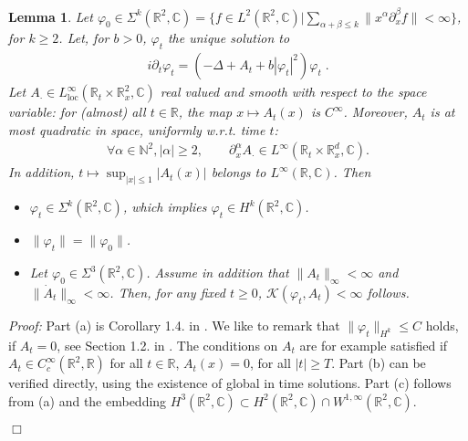 \documentclass[11pt, english, american]{article}
\newtheorem{lemma}[theorem]{Lemma}
\newenvironment{proof}{\emph{Proof:}}{\begin{flushright} $ \Box $ \end{flushright}}
\renewcommand{\phi}{\varphi}
\begin{document}
\begin{lemma} \label{regularityLemma}
Let $\phi_0  \in 
\Sigma^k(\mathbb{R}^2,\mathbb{C})
=
\lbrace
f \in L^2 (\mathbb{R}^2, \mathbb{C})|
\sum_{ \alpha+ \beta \leq k} \|x^\alpha \partial_x^\beta f \| < \infty
\rbrace
$, for $k\geq2$. 
Let, for $b>0$,
$\phi_t$ the unique solution to
\begin{align*}
i \partial_t \phi_t = (-\Delta+A_t+ b |\phi_t|^2) \phi_t \;.
\end{align*}
Let $A_{\cdot} \in L^\infty_{\text{loc}}(\mathbb{R}_t \times \mathbb{R}^2_x, \mathbb{C})$ real valued and smooth with respect to the space variable: for (almost) all $t \in \mathbb{R}$,
the map $x \mapsto A_t(x)$ is $C^\infty$. Moreover, $A_t$ is at most quadratic in space, uniformly w.r.t. time $t$:
\begin{align*}
\forall \alpha \in \mathbb{N}^2, | \alpha | \geq 2, \qquad \partial_x^\alpha A_{\cdot}
\in L^\infty(\mathbb{R}_t \times \mathbb{R}^d_x, \mathbb{C}).
\end{align*}
In addition, $t \mapsto \sup_{|x| \leq 1} |A_t(x)|$ belongs to $L^{\infty}(\mathbb{R}, \mathbb{C})$.
Then 
\begin{itemize}
\item[(a)]
$ \phi_t \in \Sigma^k(\mathbb{R}^2,\mathbb{C})$, which implies $ \phi_t \in H^k(\mathbb{R}^2,\mathbb{C})$.
\item[(b)]
$\| \phi_t\|=\| \phi_0 \|$.
\item[(c)]  
Let $ \phi_0 \in \Sigma^3(\mathbb{R}^2,\mathbb{C})$. Assume in addition that
$\| A_t \|_\infty < \infty$ and $\| \dot{A}_t \|_\infty < \infty$.
Then, for any fixed $t \geq 0$, 
$ \mathcal{K}(\phi_t, A_t) < \infty$ follows.


\end{itemize}
\end{lemma}
\begin{proof}
Part (a) is Corollary 1.4. in \cite{carles}. We like to remark that $\| \phi_t \| _{H^k} \leq C$ holds, if $A_t=0$, see Section 1.2. in \cite{carles}.
The conditions on $A_t$ are for example satisfied if
 $A_t \in C^\infty_c (\mathbb{R}^2, \mathbb{R})$ for all $t \in \mathbb{R}$, $A_t(x)=0$, for all $|t| \geq T$.
Part (b) can be verified directly, using the existence of global in time solutions. 
Part (c) follows from (a) and the embedding
$H^3(\mathbb{R}^2,\mathbb{C}) \subset  H^2(\mathbb{R}^2,\mathbb{C}) \cap W^{1,\infty}(\mathbb{R}^2, \mathbb{C}) $.


\end{proof}
\end{document}
